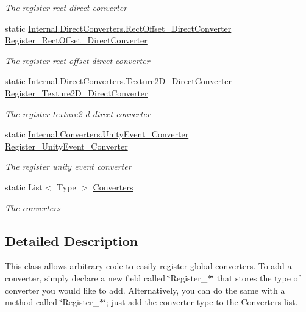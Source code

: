 \begin{DoxyCompactItemize}
\begin{DoxyCompactList}\small\item\em The register rect direct converter \end{DoxyCompactList}\item 
static \hyperlink{class_full_serializer_1_1_internal_1_1_direct_converters_1_1_rect_offset___direct_converter}{Internal.\+Direct\+Converters.\+Rect\+Offset\+\_\+\+Direct\+Converter} \hyperlink{class_full_serializer_1_1fs_converter_registrar_ab6060b37eb73d927f8cef47115da8fbb}{Register\+\_\+\+Rect\+Offset\+\_\+\+Direct\+Converter}
\begin{DoxyCompactList}\small\item\em The register rect offset direct converter \end{DoxyCompactList}\item 
static \hyperlink{class_full_serializer_1_1_internal_1_1_direct_converters_1_1_texture2_d___direct_converter}{Internal.\+Direct\+Converters.\+Texture2\+D\+\_\+\+Direct\+Converter} \hyperlink{class_full_serializer_1_1fs_converter_registrar_a01f5bb8df4c4175c21f49091cb214fae}{Register\+\_\+\+Texture2\+D\+\_\+\+Direct\+Converter}
\begin{DoxyCompactList}\small\item\em The register texture2 d direct converter \end{DoxyCompactList}\item 
static \hyperlink{class_full_serializer_1_1_internal_1_1_converters_1_1_unity_event___converter}{Internal.\+Converters.\+Unity\+Event\+\_\+\+Converter} \hyperlink{class_full_serializer_1_1fs_converter_registrar_a9be90a403c0a8f2453ce3b8970c9bea6}{Register\+\_\+\+Unity\+Event\+\_\+\+Converter}
\begin{DoxyCompactList}\small\item\em The register unity event converter \end{DoxyCompactList}\item 
static List$<$ Type $>$ \hyperlink{class_full_serializer_1_1fs_converter_registrar_abe9027e3fcd222955b36d41e409fd6f0}{Converters}
\begin{DoxyCompactList}\small\item\em The converters \end{DoxyCompactList}\end{DoxyCompactItemize}


\subsection{Detailed Description}
This class allows arbitrary code to easily register global converters. To add a converter, simply declare a new field called \char`\"{}\+Register\+\_\+$\ast$\char`\"{} that stores the type of converter you would like to add. Alternatively, you can do the same with a method called \char`\"{}\+Register\+\_\+$\ast$\char`\"{}; just add the converter type to the {\ttfamily Converters} list. 




